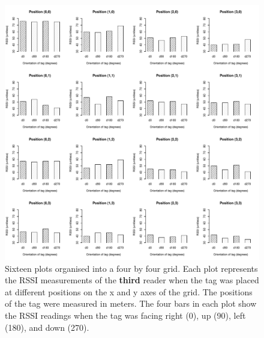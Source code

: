 \begin{figure}[H]
	\begin{center}
		\includegraphics[width=1\textwidth]{figures/rssi_distance_grid_r3}
		\caption{Sixteen plots organised into a four by four grid. Each plot represents the RSSI measurements of the \textbf{third} reader when the tag was placed at different positions on the x and y axes of the grid. The positions of the tag were  measured in meters. The four bars in each plot show the RSSI readings when the tag was facing right (0\textdegree), up (90\textdegree), left (180\textdegree), and down (270\textdegree).}
	\end{center}
\end{figure}
